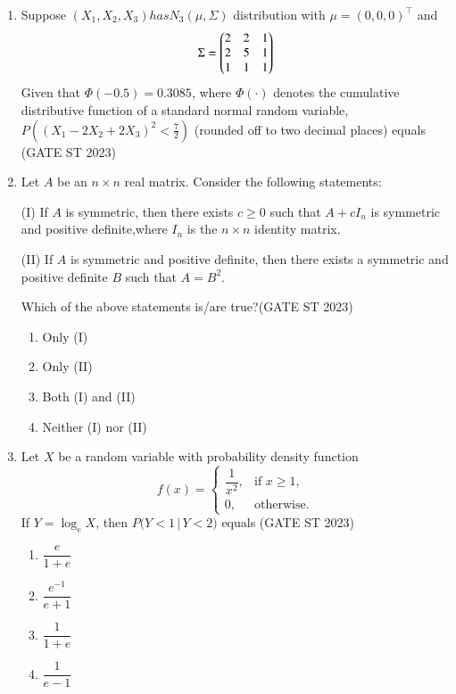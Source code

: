 \documentclass[journal]{IEEEtran}
\begin{document}
\begin{enumerate}[label=\textbf{Q.\arabic*.}, start=11, align=left, itemsep=2em]
\item Suppose $(X_1, X_2, X_3) has N_3(\mu, \Sigma)$ distribution with $\mu = (0,0,0)^\top$ and
\[
\Sigma =
\begin{pmatrix}
2 & 2 & 1 \\
2 & 5 & 1 \\
1 & 1 & 1
\end{pmatrix}
\]
Given that $\Phi(-0.5) = 0.3085$, where $\Phi(\cdot)$ denotes the cumulative distributive function of a standard normal random variable,\\

$P\left( (X_1 - 2X_2 + 2X_3)^2 < \frac{7}{2} \right)$ (rounded off to two decimal places) equals \underline{\hspace{3cm}}\hfill(GATE ST 2023)


\item Let $A$ be an $n\times n$ real matrix. Consider the following statements: 

(I) If $A$ is symmetric, then there exists $c \ge 0$ such that $A + c I_n$ is symmetric and positive definite,where $I_n$ is the $n\times n$ identity matrix. 

(II) If $A$ is symmetric and positive definite, then there exists a symmetric and positive definite $B$ such that $A = B^2$. 

Which of the above statements is/are true?\hfill(GATE ST 2023)
\begin{enumerate}
\item Only (I)
\item Only (II)
\item Both (I) and (II)
\item Neither (I) nor (II)
\end{enumerate}

\item Let $X$ be a random variable with probability density function  
\[
f(x) =
\begin{cases}
\dfrac{1}{x^{2}}, & \text{if } x \ge 1, \\
0, & \text{otherwise}.
\end{cases}
\]
If $Y = \log_{e} X$, then $P\big(Y < 1 \,\big|\, Y < 2\big)$ equals  \hfill(GATE ST 2023)

\begin{enumerate}
    \item $\dfrac{e}{1+e}$
    \item $\dfrac{e^{-1}}{e+1}$
    \item $\dfrac{1}{1+e}$
    \item $\dfrac{1}{e-1}$
\end{enumerate}



\end{enumerate}
\end{document}
